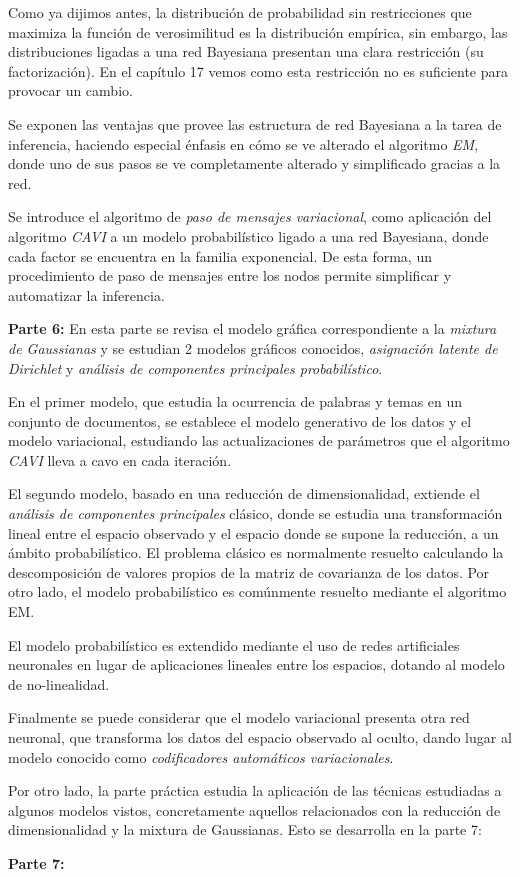 Como ya dijimos antes, la distribución de probabilidad sin restricciones que maximiza la función de verosimilitud es la distribución empírica, sin embargo, las distribuciones ligadas a una red Bayesiana presentan una clara restricción (su factorización). En el capítulo 17 vemos como esta restricción no es suficiente para provocar un cambio.

Se exponen las ventajas que provee las estructura de red Bayesiana a la tarea de inferencia, haciendo especial énfasis en cómo se ve alterado el algoritmo \emph{EM}, donde uno de sus pasos se ve completamente alterado y simplificado gracias a la red.

Se introduce el algoritmo de \emph{paso de mensajes variacional}, como aplicación del algoritmo \emph{CAVI} a un modelo probabilístico ligado a una red Bayesiana, donde cada factor se encuentra en la familia exponencial. De esta forma, un procedimiento de paso de mensajes entre los nodos permite simplificar y automatizar la  inferencia.

\textbf{Parte 6:} En esta parte se revisa el modelo gráfica correspondiente a la \emph{mixtura de Gaussianas} y se estudian 2 modelos gráficos conocidos, \emph{asignación latente de Dirichlet} y \emph{análisis de componentes principales probabilístico}.

En el primer modelo, que estudia la ocurrencia de palabras y temas en un conjunto de documentos, se establece el modelo generativo de los datos y el modelo variacional, estudiando las actualizaciones de parámetros que el algoritmo \emph{CAVI} lleva a cavo en cada iteración.

El segundo modelo, basado en una reducción de dimensionalidad, extiende el \emph{análisis de componentes principales} clásico, donde se estudia una transformación lineal entre el espacio observado y el espacio donde se supone la reducción, a un ámbito probabilístico. El problema clásico es normalmente resuelto calculando la descomposición de valores propios de la matriz de covarianza de los datos. Por otro lado, el modelo probabilístico es comúnmente resuelto mediante el algoritmo EM.

El modelo probabilístico es extendido mediante el uso de redes artificiales neuronales en lugar de aplicaciones lineales entre los espacios, dotando al modelo de no-linealidad.

Finalmente se puede considerar que el modelo variacional presenta otra red neuronal, que transforma los datos del espacio observado al oculto, dando lugar al modelo conocido como \emph{codificadores automáticos variacionales}.

Por otro lado, la parte práctica estudia la aplicación de las técnicas estudiadas a algunos modelos vistos, concretamente aquellos relacionados con la reducción de dimensionalidad y la mixtura de Gaussianas. Esto se desarrolla en la parte 7:

\textbf{Parte 7:}
